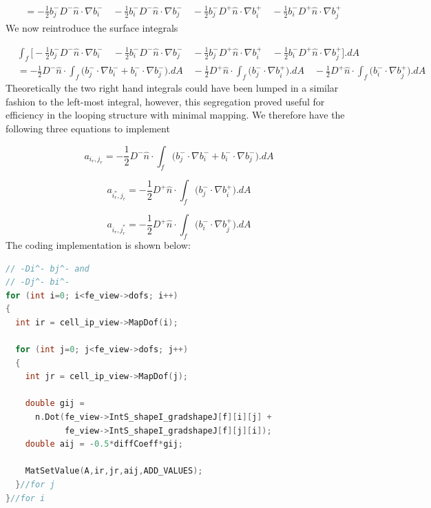 \documentclass[11pt,letterpaper,titlepage]{article}
\numberwithin{equation}{section}
\begin{document}
\begin{equation*}
\begin{aligned}
&=
- \frac{1}{2} b_j^- D^-\hat{n}\cdot\nabla b_i^- \quad
- \frac{1}{2} b_i^- D^-\hat{n}\cdot\nabla b_j^- \quad
- \frac{1}{2} b_j^- D^+\hat{n}\cdot\nabla b_i^+ \quad
- \frac{1}{2} b_i^- D^+\hat{n}\cdot\nabla b_j^+ 
\end{aligned}
\end{equation*}
\newline
We now reintroduce the surface integrals

\begin{equation*}
\begin{aligned}
&\int_f \biggr[
- \frac{1}{2} b_j^- D^-\hat{n}\cdot\nabla b_i^- \quad
- \frac{1}{2} b_i^- D^-\hat{n}\cdot\nabla b_j^- \quad
- \frac{1}{2} b_j^- D^+\hat{n}\cdot\nabla b_i^+ \quad
- \frac{1}{2} b_i^- D^+\hat{n}\cdot\nabla b_j^+ 
\biggr].dA \\
&=- \frac{1}{2} D^-\hat{n} \cdot \int_f \biggr(
b_j^- \cdot\nabla b_i^- +
b_i^- \cdot\nabla b_j^-
\biggr).dA \quad
- \frac{1}{2} D^+\hat{n}\cdot  \int_f \biggr(
b_j^- \cdot\nabla b_i^+
\biggr).dA \quad
- \frac{1}{2} D^+\hat{n}\cdot  \int_f \biggr(
b_i^- \cdot\nabla b_j^+
\biggr).dA
\end{aligned}
\end{equation*}
\newline
Theoretically the two right hand integrals could have been lumped in a similar fashion to the left-most integral, however, this segregation proved useful for efficiency in the looping structure with minimal mapping. We therefore have the following three equations to implement

\begin{equation}
a_{i_r,j_r} = 
- \frac{1}{2} D^-\hat{n} \cdot \int_f \biggr(
b_j^- \cdot\nabla b_i^- +
b_i^- \cdot\nabla b_j^-
\biggr).dA
\end{equation}

\begin{equation}
a_{i_r^*,j_r} = 
- \frac{1}{2} D^+\hat{n}\cdot  \int_f \biggr(
b_j^- \cdot\nabla b_i^+
\biggr).dA
\end{equation}

\begin{equation}
a_{i_r,j_r^*} = 
- \frac{1}{2} D^+\hat{n}\cdot  \int_f \biggr(
b_i^- \cdot\nabla b_j^+
\biggr).dA
\end{equation}
\newline
The coding implementation is shown below:

\vspace{0.5cm}
\begin{lstlisting}[language=c++]
// -Di^- bj^- and
// -Dj^- bi^-
for (int i=0; i<fe_view->dofs; i++)
{
  int ir = cell_ip_view->MapDof(i);

  for (int j=0; j<fe_view->dofs; j++)
  {
    int jr = cell_ip_view->MapDof(j);

    double gij =
      n.Dot(fe_view->IntS_shapeI_gradshapeJ[f][i][j] +
            fe_view->IntS_shapeI_gradshapeJ[f][j][i]);
    double aij = -0.5*diffCoeff*gij;

    MatSetValue(A,ir,jr,aij,ADD_VALUES);
  }//for j
}//for i
\end{lstlisting}
\end{document}
